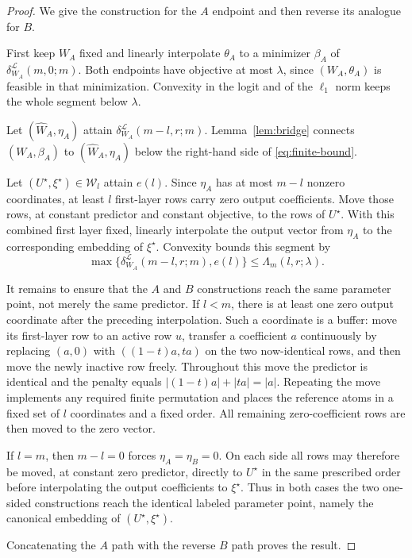 \documentclass[pdflatex,sn-mathphys-num]{sn-jnl}
\theoremstyle{thmstyleone}
\theoremstyle{thmstyletwo}
\theoremstyle{thmstylethree}
\begin{document}
\begin{proof}
We give the construction for the $A$ endpoint and then reverse its analogue for $B$.

First keep $W_A$ fixed and linearly interpolate $\theta_A$ to a minimizer $\beta_A$ of $\delta_{W_A}^{\mathcal L}(m,0;m)$. Both endpoints have objective at most $\lambda$, since $(W_A,\theta_A)$ is feasible in that minimization. Convexity in the logit and of the $\ell_1$ norm keeps the whole segment below $\lambda$.

Let $(\widehat W_A,\eta_A)$ attain $\delta_{W_A}^{\mathcal L}(m-l,r;m)$. Lemma~\ref{lem:bridge} connects $(W_A,\beta_A)$ to $(\widehat W_A,\eta_A)$ below the right-hand side of \eqref{eq:finite-bound}.

Let $(U^\star,\xi^\star)\in\mathcal W_l$ attain $e(l)$. Since $\eta_A$ has at most $m-l$ nonzero coordinates, at least $l$ first-layer rows carry zero output coefficients. Move those rows, at constant predictor and constant objective, to the rows of $U^\star$. With this combined first layer fixed, linearly interpolate the output vector from $\eta_A$ to the corresponding embedding of $\xi^\star$. Convexity bounds this segment by
\[
\max\{\delta_{W_A}^{\mathcal L}(m-l,r;m),e(l)\}\le\Lambda_m(l,r;\lambda).
\]

It remains to ensure that the $A$ and $B$ constructions reach the same parameter point, not merely the same predictor. If $l<m$, there is at least one zero output coordinate after the preceding interpolation. Such a coordinate is a buffer: move its first-layer row to an active row $u$, transfer a coefficient $a$ continuously by replacing $(a,0)$ with $((1-t)a,ta)$ on the two now-identical rows, and then move the newly inactive row freely. Throughout this move the predictor is identical and the penalty equals $|(1-t)a|+|ta|=|a|$. Repeating the move implements any required finite permutation and places the reference atoms in a fixed set of $l$ coordinates and a fixed order. All remaining zero-coefficient rows are then moved to the zero vector.

If $l=m$, then $m-l=0$ forces $\eta_A=\eta_B=0$. On each side all rows may therefore be moved, at constant zero predictor, directly to $U^\star$ in the same prescribed order before interpolating the output coefficients to $\xi^\star$. Thus in both cases the two one-sided constructions reach the identical labeled parameter point, namely the canonical embedding of $(U^\star,\xi^\star)$.

Concatenating the $A$ path with the reverse $B$ path proves the result.
\end{proof}
\end{document}
